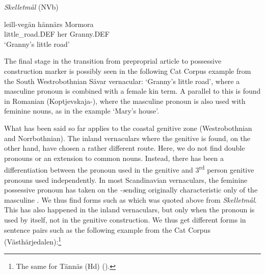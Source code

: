 
\item 

\textit{Skelletmål } (NVb)



 \ea\label{}
\gll leill-vegän  hännärs  Mormora\\


little\_road.DEF  her  Granny.DEF\\

\glt ‘Granny’s little road’

\z

 The final stage in the transition from preproprial article to possessive construction marker is possibly seen in the following Cat Corpus example from the South Westrobothnian Sävar vernacular: ‘Granny’s little road’, where a masculine pronoun is combined with a female kin term. A parallel to this is found in Romanian (Koptjevskaja-\citet[632]{Tamm2003}), where the masculine pronoun  is also used with feminine nouns, as in the example  ‘Mary’s house’.


What has been said so far applies to the coastal genitive zone (Westrobothnian and Norrbothnian). The inland vernaculars where the genitive is found, on the other hand, have chosen a rather different route. Here, we do not find double pronouns or an extension to common nouns. Instead, there has been a differentiation between the pronoun used in the genitive and 3\textsuperscript{rd} person genitive pronouns used independently. In most Scandinavian vernaculars, the feminine possessive pronoun has taken on the\textit{ {}-s}\textstyleLinguisticExample{ }ending originally characteristic only of the masculine . We thus find forms such as  which was quoted above from \textit{Skelletmål}. This has also happened in the inland vernaculars, but only when the pronoun is used by itself, not in the genitive construction. We thus get different forms in sentence pairs such as the following example from the Cat Corpus (Västhärjedalen):\footnote{ The same for Tännäs (Hd) (\citet[22]{Olofsson1999}).}

